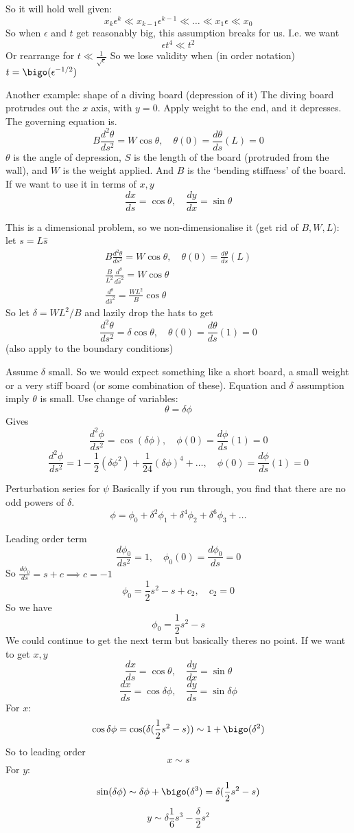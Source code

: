 \documentclass{X:/Documents/Coding/Latex/myassignment}
\begin{document}
So it will hold well given:
\[x_k \epsilon^k \ll x_{k-1}\epsilon^{k-1} \ll \hdots \ll x_1\epsilon \ll x_0\]
So when $\epsilon$ and $t$ get reasonably big, this assumption breaks for us.
I.e. we want
\[\epsilon t^4 \ll t^2\]
Or rearrange for $t \ll \frac{1}{\sqrt{\epsilon}}$ 
So we lose validity when (in order notation) $t = \bigo(\epsilon^{-1/2})$

Another example: shape of a diving board (depression of it)
The diving board protrudes out the $x$ axis, with $y=0$. Apply weight to the end, and it depresses.
The governing equation is.
\[B \frac{d^2\theta}{ds^2} = W \cos\theta, \quad \theta(0) = \frac{d\theta}{ds}(L) = 0\]
$\theta$ is the angle of depression, $S$ is the length of the board (protruded from the wall), and $W$ is the weight applied. And $B$ is the `bending stiffness' of the board.
If we want to use it in terms of $x,y$
\[\frac{dx}{ds} = \cos\theta, \quad \frac{dy}{dx} = \sin\theta\]

This is a dimensional problem, so we non-dimensionalise it (get rid of $B,W,L$): let $s = L\hat{s}$
\begin{align*}
    B \frac{d^2\theta}{ds^2} = W \cos\theta, \quad \theta(0) = \frac{d\theta}{ds}(L)\\
    \frac{B}{L^2} \frac{d^\theta}{d\hat{s}^2} = W \cos\theta\\
    \frac{d^\theta}{d\hat{s}^2} = \frac{WL^2}{B} \cos\theta
\end{align*}
So let $\delta = WL^2/B$ and lazily drop the hats to get
\[\frac{d^2\theta}{ds^2} = \delta \cos\theta, \quad \theta(0) = \frac{d\theta}{ds}(1) = 0\]
(also apply to the boundary conditions)


Assume $\delta$ small. So we would expect something like a short board, a small weight or a very stiff board (or some combination of these).
Equation and $\delta$ assumption imply $\theta$ is small. Use change of variables:
\[\theta = \delta\phi\]
Gives
\[\frac{d^2\phi}{ds^2} = \cos(\delta\phi), \quad \phi(0) = \frac{d\phi}{ds} (1) = 0\]
\[\frac{d^2\phi}{ds^2} = 1 - \frac12 (\delta\phi^2) + \frac1{24}(\delta\phi)^4 + \hdots, \quad \phi(0) = \frac{d\phi}{ds} (1) = 0\]

Perturbation series for $\psi$
Basically if you run through, you find that there are no odd powers of $\delta$.
\[\phi = \phi_0 + \delta^2 \phi_1 + \delta^4 \phi_2 + \delta^6\phi_3 + \hdots\]

Leading order term
\[\frac{d\phi_0}{ds^2} = 1, \quad \phi_0(0) = \frac{d\phi_0}{ds} = 0\]
So $\frac{d\phi_0}{ds} = s+c \implies c=-1$
\[\phi_0 = \frac12 s^2 - s + c_2, \quad c_2 = 0 \]
So we have
\[\phi_0 = \frac12 s^2 -s\]
We could continue to get the next term but basically theres no point.
If we want to get $x,y$
\[\frac{dx}{ds} = \cos\theta, \quad \frac{dy}{dx} = \sin\theta\]
\[\frac{dx}{ds} = \cos\delta\phi, \quad \frac{dy}{ds} = \sin\delta\phi\]
For $x$:
\[\cos\delta\phi = \cos(\delta(\frac12 s^2 - s)) \sim 1 + \bigo(\delta^2)\]
So to leading order
\[x \sim s\]
For $y$:
\[\sin(\delta\phi) \sim \delta\phi + \bigo(\delta^3) = \delta (\frac12 s^2 -s)\]
\[y \sim \delta \frac16 s^3 - \frac{\delta}{2} s^2 \]
\end{document}
